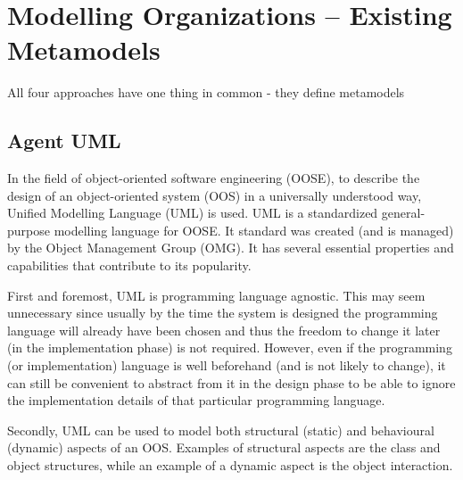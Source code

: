 
\chapter{Modelling Organizations -- Existing Metamodels}

All four approaches have one thing in common - they define metamodels  

\section{Agent UML}

In the field of object-oriented software engineering (OOSE), to describe the design of an object-oriented system (OOS) in a universally understood way, Unified Modelling Language (UML) is used.
UML is a standardized general-purpose modelling language for OOSE.
It standard was created (and is managed) by the Object Management Group (OMG).
It has several essential properties and capabilities that contribute to its popularity.

First and foremost, UML is programming language agnostic.
This may seem unnecessary since usually by the time the system is designed the programming language will already have been chosen and thus the freedom to change it later (in the implementation phase) is not required.
However, even if the programming (or implementation) language is well beforehand (and is not likely to change), it can still be convenient to abstract from it in the design phase to be able to ignore the implementation details of that particular programming language.

Secondly, UML can be used to model both structural (static) and behavioural (dynamic) aspects of an OOS.
Examples of structural aspects are the class and object structures, while an example of a dynamic aspect is the object interaction.

